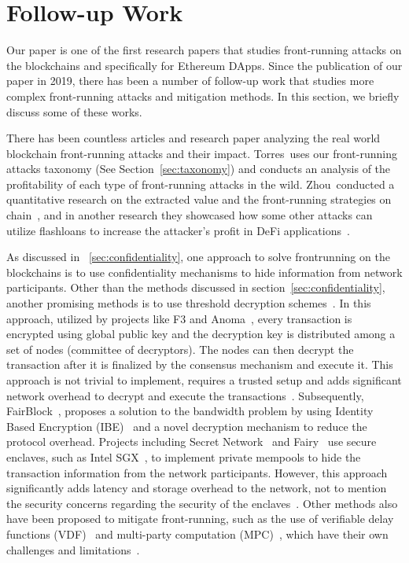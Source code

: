 \section{Follow-up Work}

Our paper is one of the first research papers that studies front-running attacks on the blockchains and specifically for Ethereum DApps. Since the publication of our paper in 2019, there has been a number of follow-up work that studies more complex front-running attacks and mitigation methods. In this section, we briefly discuss some of these works.

There has been countless articles and research paper analyzing the real world blockchain front-running attacks and their impact. Torres~\etal uses our front-running attacks taxonomy (See Section~\ref{sec:taxonomy}) and conducts an analysis of the profitability of each type of front-running attacks in the wild. Zhou~\etal conducted a quantitative research on the extracted value and the front-running strategies on chain~\cite{qin2022quantifying}, and in another research they showcased how some other attacks can utilize flashloans to increase the attacker's profit in DeFi applications~\cite{qin2021attacking}. 

As discussed in ~\ref{sec:confidentiality}, one approach to solve frontrunning on the blockchains is to use confidentiality mechanisms to hide information from network participants. Other than the methods discussed in section~\ref{sec:confidentiality}, another promising methods is to use threshold decryption schemes~\cite{breidenbach2021chainlink,bebel2022ferveo}. In this approach, utilized by projects like F3 and Anoma~\cite{zhang2022f3b,asayag2018fair,wang2021ibatch}, every transaction is encrypted using global public key and the decryption key is distributed among a set of nodes (committee of decryptors). The nodes can then decrypt the transaction after it is finalized by the consensus mechanism and execute it. This approach is not trivial to implement, requires a trusted setup and adds significant network overhead to decrypt and execute the transactions~\cite{momeni2022fairblock}. Subsequently, FairBlock~\cite{momeni2022fairblock}, proposes a solution to the bandwidth problem by using Identity Based Encryption (IBE)~\cite{boneh2001identity} and a novel decryption mechanism to reduce the protocol overhead. Projects including Secret Network~\cite{secretnetwork} and Fairy~\cite{stathakopoulou2021adding} use secure enclaves, such as Intel SGX~\cite{costan2016intel}, to implement private mempools to hide the transaction information from the network participants. However, this approach significantly adds latency and storage overhead to the network, not to mention the security concerns regarding the security of the enclaves~\cite{SGX1,SGX2,SGX3,SGX4}. Other methods also have been proposed to mitigate front-running, such as the use of verifiable delay functions (VDF)~\cite{boneh2018verifiable,veedostarkware} and multi-party computation (MPC)~\cite{zhao2019secure,ciampi2022fairmm,govindarajan2022privacy}, which have their own challenges and limitations~\cite{momeni2022fairblock}.


